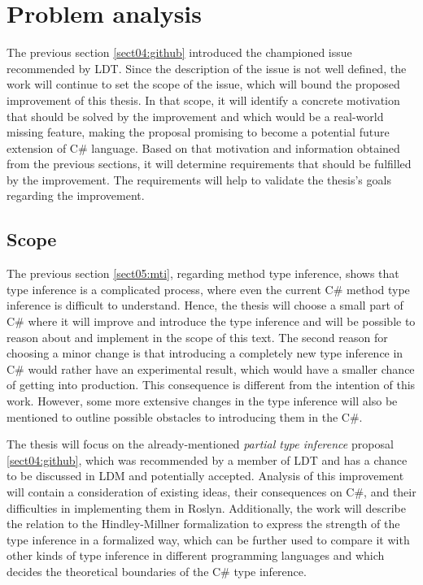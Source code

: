 \chapter{Problem analysis}

The previous section \ref{sect04:github} introduced the championed issue recommended by \ac{LDT}. 
Since the description of the issue is not well defined, the work will continue to set the scope of the issue, which will bound the proposed improvement of this thesis. 
In that scope, it will identify a concrete motivation that should be solved by the improvement and which would be a real-world missing feature, making the proposal promising to become a potential future extension of C\# language. 
Based on that motivation and information obtained from the previous sections, it will determine requirements that should be fulfilled by the improvement. 
The requirements will help to validate the thesis’s goals regarding the improvement.

\section{Scope}

The previous section \ref{sect05:mti}, regarding method type inference, shows that type inference is a complicated process, where even the current C\# method type inference is difficult to understand. 
Hence, the thesis will choose a small part of C\# where it will improve and introduce the type inference and will be possible to reason about and implement in the scope of this text. 
The second reason for choosing a minor change is that introducing a completely new type inference in C\# would rather have an experimental result, which would have a smaller chance of getting into production. 
This consequence is different from the intention of this
work. 
However, some more extensive changes in the type inference will also be mentioned to outline possible obstacles to introducing them in the C\#.
\par
The thesis will focus on the already-mentioned \textit{partial type inference} proposal \ref{sect04:github}, which was recommended by a member of \ac{LDT} and has a chance to be discussed in \ac{LDM} and potentially accepted. 
Analysis of this improvement will contain a consideration of existing ideas, their consequences on C\#, and their difficulties in implementing them in Roslyn. 
Additionally, the work will describe the relation to the Hindley-Millner formalization to express the strength of the type inference in a formalized way, which can be further used to compare it with other kinds of type inference in different programming languages and which decides the theoretical boundaries of the C\# type inference.


